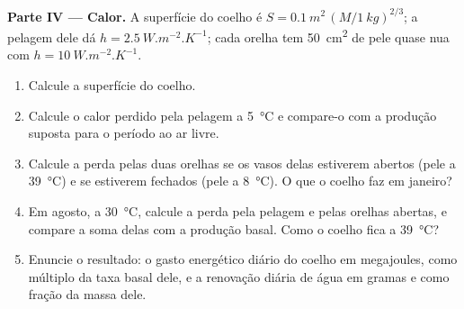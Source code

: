 \begin{problem}
\medskip
\noindent\textbf{Parte IV --- Calor.}
A superfície do coelho é $S = \qty{0.1}{m^2}\,(M/\qty{1}{kg})^{2/3}$; a
pelagem dele dá $h = \qty{2.5}{W.m^{-2}.K^{-1}}$; cada orelha tem
\qty{50}{cm^2} de pele quase nua com $h = \qty{10}{W.m^{-2}.K^{-1}}$.
\begin{enumerate}[resume]
  \item Calcule a superfície do coelho.
  \item Calcule o calor perdido pela pelagem a \qty{5}{\celsius} e
        compare-o com a produção suposta para o período ao ar livre.
  \item Calcule a perda pelas duas orelhas se os vasos delas estiverem
        abertos (pele a \qty{39}{\celsius}) e se estiverem fechados
        (pele a \qty{8}{\celsius}). O que o coelho faz em janeiro?
  \item Em agosto, a \qty{30}{\celsius}, calcule a perda pela pelagem e
        pelas orelhas abertas, e compare a soma delas com a produção
        basal. Como o coelho fica a \qty{39}{\celsius}?
  \item Enuncie o resultado: o gasto energético diário do coelho em
        megajoules, como múltiplo da taxa basal dele, e a renovação
        diária de água em gramas e como fração da massa dele.
\end{enumerate}
\end{problem}
